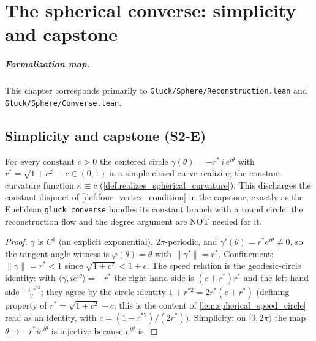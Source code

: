 \chapter{The spherical converse: simplicity and capstone}
\label{chap:sphere_converse}


\paragraph{Formalization map.}
This chapter corresponds primarily to \texttt{Gluck/Sphere/Reconstruction.lean} and \texttt{Gluck/Sphere/Converse.lean}.

\section{Simplicity and capstone (S2-E)}
\label{sec:sphere_simplicity}

\begin{lemma}
  \leanok
  \label{lem:spherical_circle_realizes}
  For every constant $c>0$ the centered circle $\gamma(\theta)=-r^\ast\,i\,e^{i\theta}$ with
  $r^\ast=\sqrt{1+c^2}-c\in(0,1)$ is a simple closed curve realizing the constant
  curvature function $\kappa\equiv c$
  (\cref{def:realizes_spherical_curvature}). This discharges the constant disjunct of
  \cref{def:four_vertex_condition} in the capstone, exactly as the Euclidean
  \texttt{gluck\_converse} handles its constant branch with a round circle; the
  reconstruction flow and the degree argument are NOT needed for it.
\end{lemma}

\begin{proof}
  \leanok
  $\gamma$ is $C^1$ (an explicit exponential), $2\pi$-periodic, and
  $\gamma'(\theta)=r^\ast e^{i\theta}\ne0$, so the tangent-angle witness is
  $\varphi(\theta)=\theta$ with $\|\gamma'\|=r^\ast$. Confinement: $\|\gamma\|=r^\ast<1$ since
  $\sqrt{1+c^2}<1+c$. The speed relation is the geodesic-circle identity: with
  $\langle \gamma,ie^{i\theta}\rangle=-r^\ast$ the right-hand side is
  $(c+r^\ast)r^\ast$ and the left-hand side $\tfrac{1+r^{\ast2}}{2}$; they agree by the
  circle identity $1+r^{\ast2}=2r^\ast(c+r^\ast)$ (defining property of
  $r^\ast=\sqrt{1+c^2}-c$; this is the content of \cref{lem:spherical_speed_circle} read
  as an identity, with $c=(1-r^{\ast2})/(2r^\ast)$). Simplicity: on $[0,2\pi)$ the map
  $\theta\mapsto -r^\ast ie^{i\theta}$ is injective because $e^{i\theta}$ is.
\end{proof}

